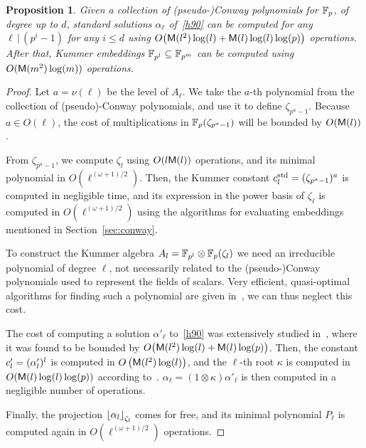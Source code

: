 \documentclass{sig-alternate}
\newtheorem{proposition}[theorem]{Proposition}
\begin{document}
\begin{proposition}
  Given a collection of (pseudo-)Conway polynomials for $\mathbb{F}_p$, of
  degree up to $d$, standard solutions $\alpha_\ell$ of~\eqref{h90} can
  be computed for any $\ell\,|\,(p^i-1)$ for any $i\le d$ using
  $O\bigr(\mathsf{M}(l^2)\log(l) + \mathsf{M}(l)\log(l)\log(p)\bigl)$ %
  operations. %
  After that, Kummer embeddings $\mathbb{F}_{p^l}\subseteq\mathbb{F}_{p^m}$ can be
  computed using $O(\mathsf{M}(m^2)\log(m))$ operations.
\end{proposition}
\begin{proof}
  Let $a=\nu(\ell)$ be the level of $A_\ell$. We take the $a$-th
  polynomial from the collection of (pseudo)-Conway polynomials, and
  use it to define $\zeta_{p^a-1}$. %
  Because $a\in O(\ell)$, the cost of multiplications in
  $\mathbb{F}_p(\zeta_{p^a-1})$ will be bounded by $O(\mathsf{M}(l))$.

  From $\zeta_{p^a-1}$, we compute $\zeta_l$ using $O(l\mathsf{M}(l))$
  operations, and its minimal polynomial in
  $O(\ell^{(\omega+1)/2})$. %
  Then, the Kummer constant $c^{\mathrm{std}}_l=(\zeta_{p^a-1})^a$ is computed
  in negligible time, and its expression in the power basis of
  $\zeta_\ell$ is computed in $O(\ell^{(\omega+1)/2})$ using the
  algorithms for evaluating embeddings mentioned in
  Section~\ref{sec:conway}.

  To construct the Kummer algebra
  $A_l=\mathbb{F}_{p^l}\otimes\mathbb{F}_p(\zeta_l)$ we need an irreducible
  polynomial of degree $\ell$, not necessarily related to the
  (pseudo-)Conway polynomials used to represent the fields of
  scalars. %
  Very efficient, quasi-optimal algorithms for finding such a
  polynomial are given
  in~\cite{BoFlSaSc06,couveignes+lercier11,DeDoSc13}, we can thus
  neglect this cost.
  
  The cost of computing a solution $\alpha'_\ell$ to~\eqref{h90} was
  extensively studied in~\cite{brieulle2018computing}, where it was
  found to be bounded by
  $O\bigr(\mathsf{M}(l^2)\log(l) + \mathsf{M}(l)\log(p)\bigl)$. %
  Then, the constant $c'_l=(\alpha'_l)^l$ is computed in
  $O\left(\mathsf{M}(l^2)\log(l)\right)$, and the $\ell$-th root
  $\kappa$ is computed in $O(\mathsf{M}(l)\log(l)\log(p))$ according
  to~\cite{brieulle2018computing}. %
  $\alpha_\ell=(1\otimes\kappa)\alpha'_\ell$ is then computed in a
  negligible number of operations.

  Finally, the projection $\left\lfloor \alpha_l \right\rfloor_{\zeta_l}$ comes for
  free, and its minimal polynomial $P_\ell$ is computed again in
  $O(\ell^{(\omega+1)/2})$ operations.


\end{proof}
\end{document}
